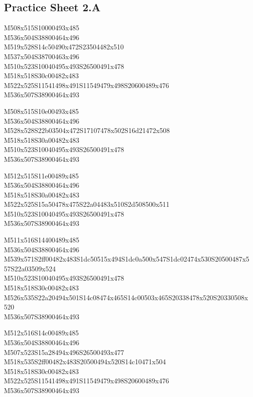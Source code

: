 \documentclass{article}
\begin{document}
\subsection{Practice Sheet 2.A}

\begin{multicols}{5}
\begin{center}

M508x515S10000493x485 %
\\M536x504S38800464x496 %
\\M519x528S14c50490x472S23504482x510 %
\\M537x504S38700463x496 %
\\M510x523S10040495x493S26500491x478 %
\\M518x518S30c00482x483 %
\\M522x525S11541498x491S11549479x498S20600489x476 %
\\M536x507S38900464x493 %
\vfil
\columnbreak

M508x515S10e00493x485 %
\\M536x504S38800464x496 %
\\M528x528S22b03504x472S17107478x502S16d21472x508 %
\\M518x518S30a00482x483 %
\\M510x523S10040495x493S26500491x478 %
\\M536x507S38900464x493 %
\vfil
\columnbreak

M512x515S11e00489x485 %
\\M536x504S38800464x496 %
\\M518x518S30a00482x483 %
\\M522x525S15a50478x475S22a04483x510S2d508500x511 %
\\M510x523S10040495x493S26500491x478 %
\\M536x507S38900464x493 %
\vfil
\columnbreak

M511x516S14400489x485 %
\\M536x504S38800464x496 %
\\M539x571S2ff00482x483S1dc50515x494S1dc0a500x547S1dc02474x530S20500487x557S22a03509x524 %
\\M510x523S10040495x493S26500491x478 %
\\M518x518S30c00482x483 %
\\M526x535S22a20494x501S14c08474x465S14c00503x465S20338478x520S20330508x520 %
\\M536x507S38900464x493 %
\vfil
\columnbreak

M512x516S14c00489x485 %
\\M536x504S38800464x496 %
\\M507x523S15a28494x496S26500493x477 %
\\M518x535S2ff00482x483S20500494x520S14c10471x504 %
\\M518x518S30c00482x483 %
\\M522x525S11541498x491S11549479x498S20600489x476 %
\\M536x507S38900464x493 %
\vfil

\end{center}
\end{multicols}
\end{document}
